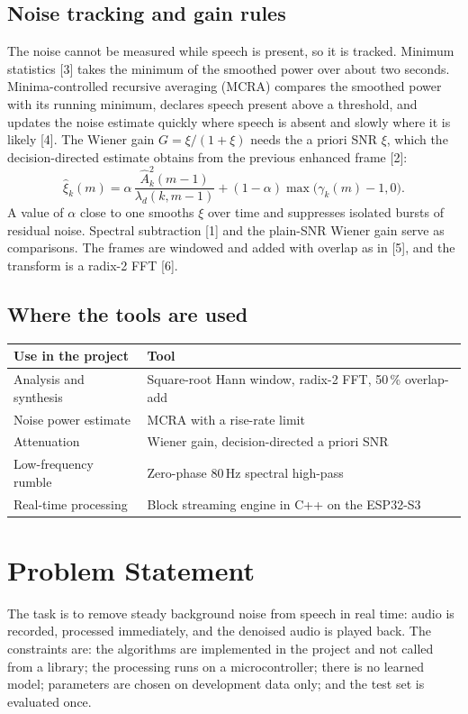 \documentclass[11pt,a4paper]{article}
\numberwithin{figure}{section}
\numberwithin{table}{section}
\numberwithin{equation}{section}
\begin{document}
\subsection{Noise tracking and gain rules}
The noise cannot be measured while speech is present, so it is tracked. Minimum statistics [3] takes the minimum of the smoothed power over about
two seconds. Minima-controlled recursive averaging (MCRA) compares the smoothed power with its running minimum, declares speech present above a
threshold, and updates the noise estimate quickly where speech is absent and slowly where it is
likely [4]. The Wiener gain $G=\xi/(1+\xi)$ needs the a priori SNR $\xi$, which the decision-directed
estimate obtains from the previous enhanced frame [2]:
\begin{equation}
\hat\xi_k(m)=\alpha\,\frac{\hat A_k^2(m-1)}{\lambda_d(k,m-1)}+(1-\alpha)\max\bigl(\gamma_k(m)-1,0\bigr).
\end{equation}
A value of $\alpha$ close to one smooths $\xi$ over time and suppresses isolated bursts of residual
noise. Spectral subtraction [1] and the plain-SNR Wiener gain serve as comparisons. The frames are windowed and
added with overlap as in [5], and the transform is a radix-2 FFT [6].

\subsection{Where the tools are used}
\begin{center}
\small
\begin{tabular}{>{\raggedright\arraybackslash}p{58mm}>{\raggedright\arraybackslash}p{90mm}}
\hline
\rowcolor{headfill} \textbf{Use in the project} & \textbf{Tool} \\ \hline
Analysis and synthesis & Square-root Hann window, radix-2 FFT, 50\,\% overlap-add \\ \hline
Noise power estimate & MCRA with a rise-rate limit \\ \hline
Attenuation & Wiener gain, decision-directed a priori SNR \\ \hline
Low-frequency rumble & Zero-phase 80\,Hz spectral high-pass \\ \hline
Real-time processing & Block streaming engine in C++ on the ESP32-S3 \\ \hline
\end{tabular}
\end{center}

\section{Problem Statement}
The task is to remove steady background noise from speech in real time: audio is recorded, processed
immediately, and the denoised audio is played back. The constraints are: the algorithms are
implemented in the project and not called from a library; the processing runs on a microcontroller;
there is no learned model; parameters are chosen on development data only; and the test set is
evaluated once.
\end{document}
